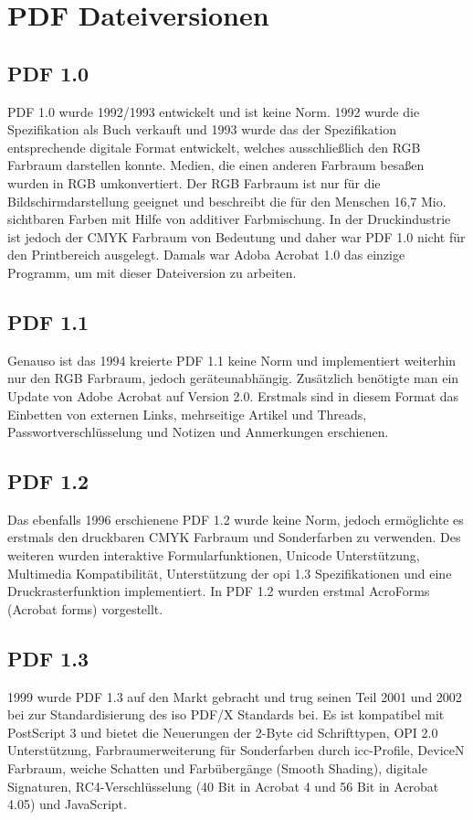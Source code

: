 \section{PDF Dateiversionen}

\subsection{PDF 1.0}
PDF 1.0 wurde 1992/1993 entwickelt und ist keine Norm. 1992 wurde die Spezifikation als Buch verkauft und 1993 wurde das der Spezifikation entsprechende digitale Format entwickelt, welches ausschließlich den RGB Farbraum darstellen konnte. Medien, die einen anderen Farbraum besaßen wurden in RGB umkonvertiert. Der RGB Farbraum ist nur für die Bildschirmdarstellung geeignet und beschreibt die für den Menschen 16,7 Mio. sichtbaren Farben mit Hilfe von additiver Farbmischung. In der Druckindustrie ist jedoch der CMYK Farbraum von Bedeutung und daher war PDF 1.0 nicht für den Printbereich ausgelegt. Damals war Adoba Acrobat 1.0 das einzige Programm, um mit dieser Dateiversion zu arbeiten. \cite{proj-consult}

\subsection{PDF 1.1}
Genauso ist das 1994 kreierte PDF 1.1 keine Norm und implementiert weiterhin nur den RGB Farbraum, jedoch geräteunabhängig. Zusätzlich benötigte man ein Update von Adobe Acrobat auf Version 2.0. Erstmals sind in diesem Format das Einbetten von externen Links, mehrseitige Artikel und Threads, Passwortverschlüsselung und Notizen und Anmerkungen erschienen. \cite{proj-consult}

\subsection{PDF 1.2}
Das ebenfalls 1996 erschienene PDF 1.2 wurde keine Norm, jedoch ermöglichte es erstmals den druckbaren CMYK Farbraum und Sonderfarben zu verwenden. Des weiteren wurden interaktive Formularfunktionen, Unicode Unterstützung, Multimedia Kompatibilität, Unterstützung der \gls{opi} 1.3 Spezifikationen und eine Druckrasterfunktion implementiert. \cite{proj-consult} In PDF 1.2 wurden erstmal AcroForms (Acrobat forms) vorgestellt.

\subsection{PDF 1.3}
1999 wurde PDF 1.3 auf den Markt gebracht und trug seinen Teil 2001 und 2002 bei zur Standardisierung des \gls{iso} PDF/X Standards bei. Es ist kompatibel mit PostScript 3 und bietet die Neuerungen der 2-Byte \gls{cid} Schrifttypen, OPI 2.0 Unterstützung, Farbraumerweiterung für Sonderfarben durch \gls{icc}-Profile, DeviceN Farbraum, weiche Schatten und Farbübergänge (Smooth Shading), digitale Signaturen, RC4-Verschlüsselung (40 Bit in Acrobat 4 und 56 Bit in Acrobat 4.05) und JavaScript. \cite{proj-consult}



